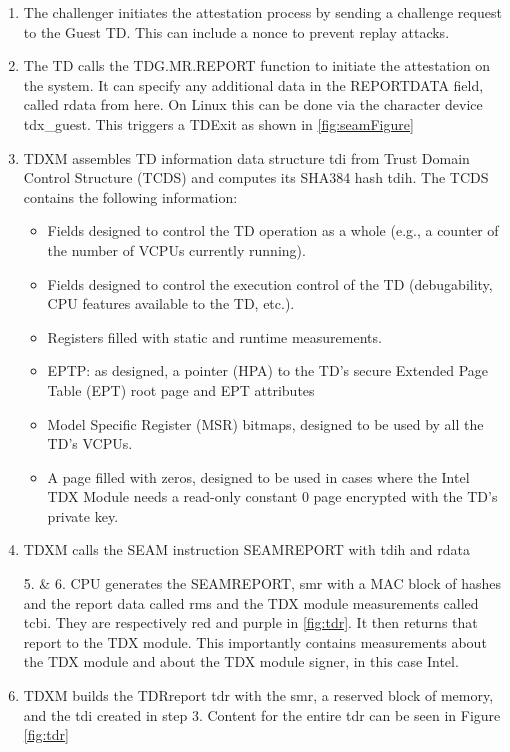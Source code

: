 \begin{enumerate}
\item The challenger initiates the attestation process by sending a challenge request to the Guest TD. This can include a nonce to prevent replay attacks\cite{sardar_formal_2023}.
\item The TD calls the TDG.MR.REPORT function to initiate the attestation on the system. It can specify any additional data in the REPORTDATA field, called rdata from here. On Linux this can be done via the character device tdx\_guest. This triggers a TDExit as shown in \cref{fig:seamFigure}
\item TDXM assembles TD information data structure tdi from Trust Domain Control Structure (TCDS) and computes its SHA384 hash tdih. The TCDS contains the following information:
\begin{itemize}
    \item Fields designed to control the TD operation as a whole (e.g., a counter of the number of VCPUs currently running). 
    \item Fields designed to control the execution control of the TD (debugability, CPU features available to the TD, etc.). 
    \item Registers filled with static and runtime measurements. 
    \item EPTP: as designed, a pointer (HPA) to the TD’s secure Extended Page Table (EPT) root page and EPT attributes
    \item Model Specific Register (MSR) bitmaps, designed to be used by all the TD’s VCPUs. 
    \item A page filled with zeros, designed to be used in cases where the Intel TDX Module needs a read-only constant 0 page encrypted with the TD’s private key.
\end{itemize}
\item TDXM calls the SEAM instruction SEAMREPORT with tdih and rdata
\item[5. \& 6.] CPU generates the SEAMREPORT, smr with a MAC block of hashes and the report data called rms and the TDX module measurements called tcbi. They are respectively red and purple in \cref{fig:tdr}. It then returns that report to the TDX module. This importantly contains measurements about the TDX module and about the TDX module signer, in this case Intel.
\item TDXM builds the TDRreport tdr with the smr, a reserved block of memory, and the tdi created in step 3. Content for the entire tdr can be seen in Figure \ref{fig:tdr}

\end{enumerate}
